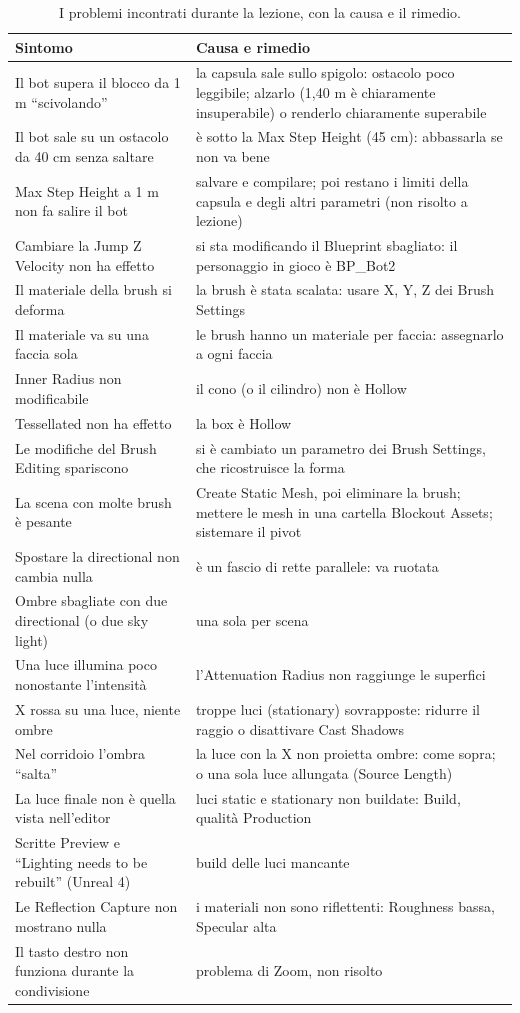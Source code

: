 \begin{table}[htbp]
\centering
\small
\begin{tabular}{@{}p{5.4cm}p{8.6cm}@{}}
\toprule
\textbf{Sintomo} & \textbf{Causa e rimedio} \\
\midrule
Il bot supera il blocco da 1 m ``scivolando'' & la capsula sale sullo spigolo: ostacolo
poco leggibile; alzarlo (1,40 m è chiaramente insuperabile) o renderlo chiaramente
superabile \\
Il bot sale su un ostacolo da 40 cm senza saltare & è sotto la Max Step Height (45 cm):
abbassarla se non va bene \\
Max Step Height a 1 m non fa salire il bot & salvare e compilare; poi restano i limiti della
capsula e degli altri parametri (non risolto a lezione) \\
Cambiare la Jump Z Velocity non ha effetto & si sta modificando il Blueprint sbagliato: il
personaggio in gioco è BP\_Bot2 \\
Il materiale della brush si deforma & la brush è stata scalata: usare X, Y, Z dei Brush
Settings \\
Il materiale va su una faccia sola & le brush hanno un materiale per faccia: assegnarlo a
ogni faccia \\
Inner Radius non modificabile & il cono (o il cilindro) non è Hollow \\
Tessellated non ha effetto & la box è Hollow \\
Le modifiche del Brush Editing spariscono & si è cambiato un parametro dei Brush Settings,
che ricostruisce la forma \\
La scena con molte brush è pesante & Create Static Mesh, poi eliminare la brush; mettere le
mesh in una cartella Blockout Assets; sistemare il pivot \\
Spostare la directional non cambia nulla & è un fascio di rette parallele: va ruotata \\
Ombre sbagliate con due directional (o due sky light) & una sola per scena \\
Una luce illumina poco nonostante l'intensità & l'Attenuation Radius non raggiunge le
superfici \\
X rossa su una luce, niente ombre & troppe luci (stationary) sovrapposte: ridurre il raggio
o disattivare Cast Shadows \\
Nel corridoio l'ombra ``salta'' & la luce con la X non proietta ombre: come sopra; o una sola
luce allungata (Source Length) \\
La luce finale non è quella vista nell'editor & luci static e stationary non buildate:
Build, qualità Production \\
Scritte Preview e ``Lighting needs to be rebuilt'' (Unreal 4) & build delle luci mancante \\
Le Reflection Capture non mostrano nulla & i materiali non sono riflettenti: Roughness bassa,
Specular alta \\
Il tasto destro non funziona durante la condivisione & problema di Zoom, non risolto \\
\bottomrule
\end{tabular}
\caption{I problemi incontrati durante la lezione, con la causa e il rimedio.}
\label{ue13:tab:errori}
\end{table}

